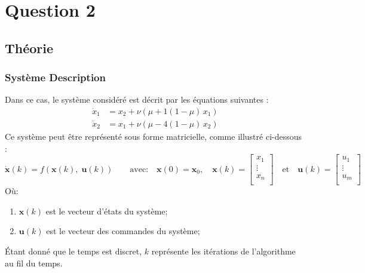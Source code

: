\documentclass[../CSC_5RO16_TA_TP4.tex]{subfiles}
\begin{document}
\section{Question 2}
\subsection{Théorie}

\subsubsection{Système Description}
\noindent Dans ce cas, le système considéré est décrit par les équations suivantes :
\begin{equation}\label{eq:system_equations}
    \boxed{
        \begin{aligned}
            \dot{x}_{1} &= x_{2} + \nu (\mu + 1(1 - \mu)\,x_{1})\\
            \dot{x}_{2} &= x_{1} + \nu (\mu - 4(1 - \mu)\,x_{2})
        \end{aligned}
    }
\end{equation}
\noindent Ce système peut être représenté sous forme matricielle, comme illustré ci-dessous :
\begin{equation}
    \dot{\mathbf{x}}(k) = f(\mathbf{x}(k),\;\mathbf{u}(k))
    \qquad\text{avec:}\quad
    \mathbf{x}(0) = \mathbf{x}_{0},
    \quad
    \mathbf{x}(k) = \begin{bmatrix}
        x_{1}\\
        \vdots\\
        x_{n}\\
    \end{bmatrix}
    \quad\text{et}\quad
    \mathbf{u}(k) = \begin{bmatrix}
        u_{1}\\
        \vdots\\
        u_{m}\\
    \end{bmatrix}
\end{equation}
\noindent Où:
\begin{enumerate}[noitemsep]
    \item $\mathbf{x}(k)$ est le vecteur d'états du système;
    \item $\mathbf{u}(k)$ est le vecteur des commandes du système;
\end{enumerate}
\begin{remark}
    Étant donné que le temps est discret, $k$ représente les itérations de l'algorithme au fil du temps.
\end{remark}
\end{document}
